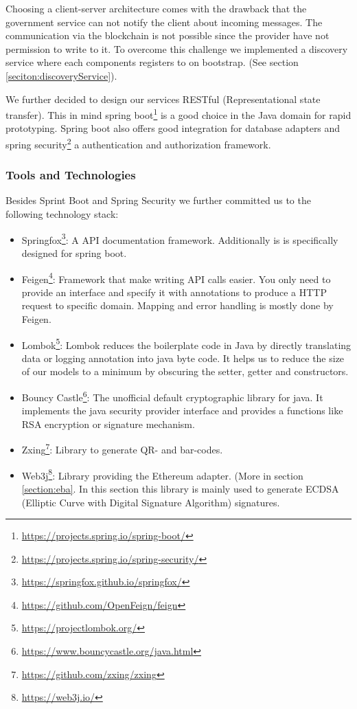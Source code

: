 Choosing a client-server architecture comes with the drawback that the government service can not notify the client about incoming messages. The communication via the blockchain is not possible since the provider have not permission to write to it. To overcome this challenge we implemented a discovery service where each components registers to on bootstrap. (See section \ref{seciton:discoveryService}).

We further decided to design our services RESTful (Representational state transfer). This in mind spring boot\footnote{\url{https://projects.spring.io/spring-boot/}} is a good choice in the Java domain for rapid prototyping. Spring boot also offers good integration for database adapters and spring security\footnote{\url{https://projects.spring.io/spring-security/}} a authentication and authorization framework. 

\subsubsection{Tools and Technologies}

Besides Sprint Boot and Spring Security we further committed us to the following technology stack: 

\begin{itemize}
\item Springfox\footnote{\url{https://springfox.github.io/springfox/}}: A API documentation framework. Additionally is is specifically designed for spring boot.
\item Feigen\footnote{\url{https://github.com/OpenFeign/feign}}: Framework that make writing API calls easier. You only need to provide an interface and specify it with annotations to produce a HTTP request to specific domain. Mapping and error handling is mostly done by Feigen. 
\item Lombok\footnote{\url{https://projectlombok.org/}}: Lombok reduces the boilerplate code in Java by directly translating data or logging annotation into java byte code. It helps us to reduce the size of our models to a minimum by obscuring the setter, getter and constructors. 
\item Bouncy Castle\footnote{\url{https://www.bouncycastle.org/java.html}}: The unofficial default cryptographic library for java. It implements the java security provider interface and provides a functions like RSA encryption or signature mechanism.
\item Zxing\footnote{\url{https://github.com/zxing/zxing}}: Library to generate QR- and bar-codes. 
\item Web3j\footnote{\url{https://web3j.io/}}: Library providing the Ethereum adapter. (More in section \ref{section:eba}. In this section this library is mainly used to generate ECDSA (Elliptic Curve with Digital Signature Algorithm) signatures. 
\end{itemize}

